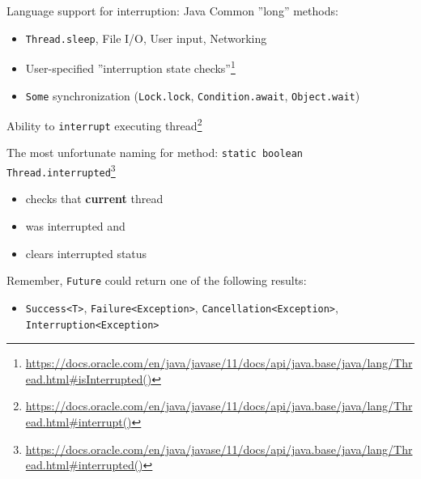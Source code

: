 \begin{frame}[t]{Language support for interruption: Java}
Common ''long'' methods:
\begin{itemize}
    \item \texttt{Thread.sleep}, File I/O, User input, Networking
    \item User-specified ''interruption state checks''\footnote{\tiny\url{https://docs.oracle.com/en/java/javase/11/docs/api/java.base/java/lang/Thread.html#isInterrupted()}}
    \pause
    \item \texttt{Some} synchronization (\texttt{Lock.lock}, \texttt{Condition.await}, \texttt{Object.wait})    
\end{itemize}

\pause
Ability to \texttt{interrupt} executing thread\footnote<3->{\tiny\url{https://docs.oracle.com/en/java/javase/11/docs/api/java.base/java/lang/Thread.html#interrupt()}}

\pause

The most unfortunate naming for method: \texttt{static boolean Thread.interrupted}\footnote<4->{\tiny\url{https://docs.oracle.com/en/java/javase/11/docs/api/java.base/java/lang/Thread.html#interrupted()}}
\begin{itemize}
    \item checks that \textbf{current} thread
    \item was interrupted and
    \item clears interrupted status
\end{itemize}

\pause

Remember, \texttt{Future} could return one of the following results:
\begin{itemize}
    \item \texttt{Success<T>}, \texttt{Failure<Exception>}, \texttt{Cancellation<Exception>}, \texttt{Interruption<Exception>}
\end{itemize}
 
\end{frame}



